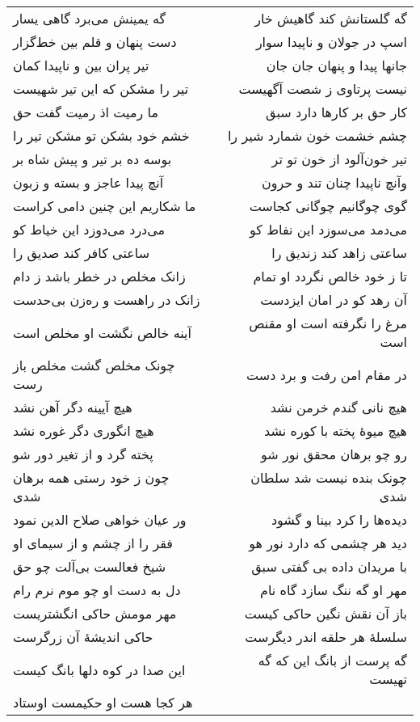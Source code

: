 \begin{center}
\begin{longtable}{l p{0.5cm} r}
گه یمینش می‌برد گاهی یسار
&&
گه گلستانش کند گاهیش خار
\\
دست پنهان و قلم بین خط‌گزار
&&
اسپ در جولان و ناپیدا سوار
\\
تیر پران بین و ناپیدا کمان
&&
جانها پیدا و پنهان جان جان
\\
تیر را مشکن که این تیر شهیست
&&
نیست پرتاوی ز شصت آگهیست
\\
ما رمیت اذ رمیت گفت حق
&&
کار حق بر کارها دارد سبق
\\
خشم خود بشکن تو مشکن تیر را
&&
چشم خشمت خون شمارد شیر را
\\
بوسه ده بر تیر و پیش شاه بر
&&
تیر خون‌آلود از خون تو تر
\\
آنچ پیدا عاجز و بسته و زبون
&&
وآنچ ناپیدا چنان تند و حرون
\\
ما شکاریم این چنین دامی کراست
&&
گوی چوگانیم چوگانی کجاست
\\
می‌درد می‌دوزد این خیاط کو
&&
می‌دمد می‌سوزد این نفاط کو
\\
ساعتی کافر کند صدیق را
&&
ساعتی زاهد کند زندیق را
\\
زانک مخلص در خطر باشد ز دام
&&
تا ز خود خالص نگردد او تمام
\\
زانک در راهست و ره‌زن بی‌حدست
&&
آن رهد کو در امان ایزدست
\\
آینه خالص نگشت او مخلص است
&&
مرغ را نگرفته است او مقنص است
\\
چونک مخلص گشت مخلص باز رست
&&
در مقام امن رفت و برد دست
\\
هیچ آیینه دگر آهن نشد
&&
هیچ نانی گندم خرمن نشد
\\
هیچ انگوری دگر غوره نشد
&&
هیچ میوهٔ پخته با کوره نشد
\\
پخته گرد و از تغیر دور شو
&&
رو چو برهان محقق نور شو
\\
چون ز خود رستی همه برهان شدی
&&
چونک بنده نیست شد سلطان شدی
\\
ور عیان خواهی صلاح الدین نمود
&&
دیده‌ها را کرد بینا و گشود
\\
فقر را از چشم و از سیمای او
&&
دید هر چشمی که دارد نور هو
\\
شیخ فعالست بی‌آلت چو حق
&&
با مریدان داده بی گفتی سبق
\\
دل به دست او چو موم نرم رام
&&
مهر او گه ننگ سازد گاه نام
\\
مهر مومش حاکی انگشتریست
&&
باز آن نقش نگین حاکی کیست
\\
حاکی اندیشهٔ آن زرگرست
&&
سلسلهٔ هر حلقه اندر دیگرست
\\
این صدا در کوه دلها بانگ کیست
&&
گه پرست از بانگ این که گه تهیست
\\
هر کجا هست او حکیمست اوستاد

\end{longtable}
\end{center}
